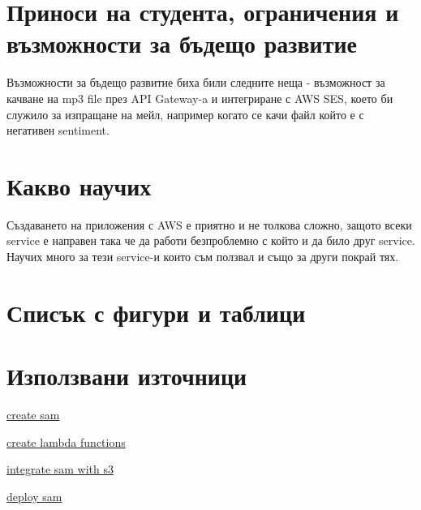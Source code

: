 \documentclass[12pt]{article}
\begin{document}
\medskip


\section{Приноси на студента, ограничения и възможности за бъдещо развитие}

Възможности за бъдещо развитие биха били следните неща - възможност за качване на mp3 file през API Gateway-a и интегриране с AWS SES, което би служило за изпращане на мейл, например когато се качи файл който е с негативен sentiment.

\medskip

\section{Какво научих}

Създаването на приложения с AWS е приятно и не толкова сложно, защото всеки service е направен така че да работи безпроблемно с който и да било друг service. Научих много за тези service-и които съм ползвал и също за други покрай тях.

\section{Списък с фигури и таблици}

\listoftables

\listoffigures

\section{Използвани източници}

\noindent\href{https://docs.aws.amazon.com/codedeploy/latest/userguide/tutorial-lambda-sam-template.html}{create sam}

\noindent\href{https://docs.aws.amazon.com/lambda/latest/dg/getting-started.html}{create lambda functions}

 \noindent\href{https://docs.aws.amazon.com/lambda/latest/dg/with-s3-example-use-app-spec.html}{integrate sam with s3}
 
 \noindent\href{https://docs.aws.amazon.com/serverless-application-model/latest/developerguide/serverless-getting-started-hello-world.html}{deploy sam}
\medskip

\bigskip
\end{document}
